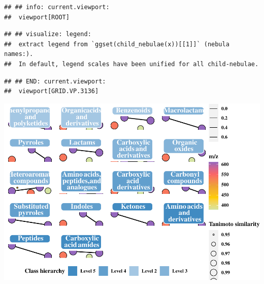 \documentclass[
]{article}
\begin{document}
\begin{verbatim}
## ## info: current.viewport: 
##  viewport[ROOT]
\end{verbatim}

\begin{verbatim}
## ## visualize: legend: 
##  extract legend from `ggset(child_nebulae(x))[[1]]` (nebula names:).
##  In default, legend scales have been unified for all child-nebulae.
\end{verbatim}

\begin{verbatim}
## ## END: current.viewport: 
##  viewport[GRID.VP.3136]
\end{verbatim}

\includegraphics{Rtips2_files/figure-latex/unnamed-chunk-12-3.pdf}
\end{document}
